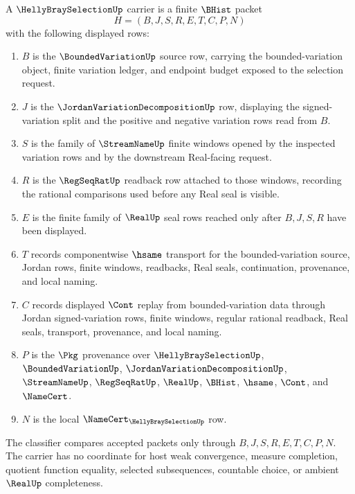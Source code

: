 \begin{definition}
\label{def:helly-bray-selection-carrier}
A $\HellyBraySelectionUp$ carrier is a finite $\BHist$ packet
$$
H=(B,J,S,R,E,T,C,P,N)
$$
with the following displayed rows:
\begin{enumerate}
\item $B$ is the $\BoundedVariationUp$ source row, carrying the bounded-variation object, finite variation ledger, and endpoint budget exposed to the selection request.
\item $J$ is the $\JordanVariationDecompositionUp$ row, displaying the signed-variation split and the positive and negative variation rows read from $B$.
\item $S$ is the family of $\StreamNameUp$ finite windows opened by the inspected variation rows and by the downstream Real-facing request.
\item $R$ is the $\RegSeqRatUp$ readback row attached to those windows, recording the rational comparisons used before any Real seal is visible.
\item $E$ is the finite family of $\RealUp$ seal rows reached only after $B,J,S,R$ have been displayed.
\item $T$ records componentwise $\hsame$ transport for the bounded-variation source, Jordan rows, finite windows, readbacks, Real seals, continuation, provenance, and local naming.
\item $C$ records displayed $\Cont$ replay from bounded-variation data through Jordan signed-variation rows, finite windows, regular rational readback, Real seals, transport, provenance, and local naming.
\item $P$ is the $\Pkg$ provenance over $\HellyBraySelectionUp$, $\BoundedVariationUp$, $\JordanVariationDecompositionUp$, $\StreamNameUp$, $\RegSeqRatUp$, $\RealUp$, $\BHist$, $\hsame$, $\Cont$, and $\NameCert$.
\item $N$ is the local $\NameCert_{\HellyBraySelectionUp}$ row.
\end{enumerate}
The classifier compares accepted packets only through $B,J,S,R,E,T,C,P,N$. The carrier has no coordinate for host weak convergence, measure completion, quotient function equality, selected subsequences, countable choice, or ambient $\RealUp$ completeness.
\end{definition}

